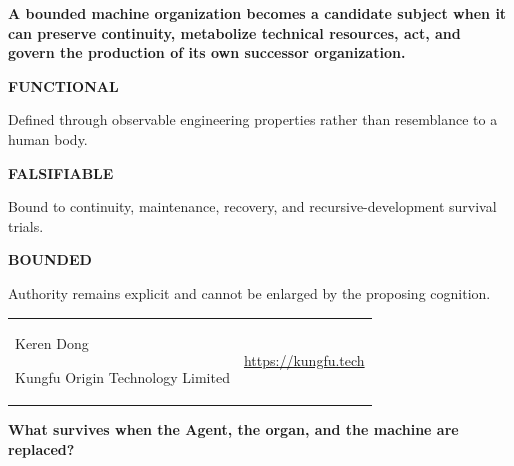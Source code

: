 \documentclass[10pt]{article}
\begin{document}
\begin{titlepage}
\vspace{0.34in}
{\sffamily\bfseries\fontsize{12}{15.5}\selectfont\color{MLWhite}
A bounded machine organization becomes a candidate subject when it can
preserve continuity, metabolize technical resources, act, and govern the
production of its own successor organization.\par}

\vspace{0.23in}
\begin{minipage}[t]{0.315\textwidth}
  \begin{mldarkcard}
    {\sffamily\bfseries\scriptsize\color{MLPeriwinkle}FUNCTIONAL}\par
    {\scriptsize\color{MLWhite}Defined through observable engineering
    properties rather than resemblance to a human body.}
  \end{mldarkcard}
\end{minipage}
\hfill
\begin{minipage}[t]{0.315\textwidth}
  \begin{mldarkcard}
    {\sffamily\bfseries\scriptsize\color{MLPeriwinkle}FALSIFIABLE}\par
    {\scriptsize\color{MLWhite}Bound to continuity, maintenance, recovery,
    and recursive-development survival trials.}
  \end{mldarkcard}
\end{minipage}
\hfill
\begin{minipage}[t]{0.315\textwidth}
  \begin{mldarkcard}
    {\sffamily\bfseries\scriptsize\color{MLPeriwinkle}BOUNDED}\par
    {\scriptsize\color{MLWhite}Authority remains explicit and cannot be
    enlarged by the proposing cognition.}
  \end{mldarkcard}
\end{minipage}

\vfill
\begin{tabularx}{\textwidth}{@{}Xr@{}}
  {\sffamily\color{MLWhite}Keren Dong\par
   \footnotesize Kungfu Origin Technology Limited} &
  {\sffamily\footnotesize\color{MLPeriwinkle}
   \href{https://kungfu.tech}{https://kungfu.tech}}
\end{tabularx}
\end{titlepage}
\pagecolor{MLPaper}

\thispagestyle{fancy}
\par
\vspace{0.1in}
{\rmfamily\bfseries\fontsize{27}{30}\selectfont\color{MLInk}
What survives when the Agent, the organ, and the machine are replaced?\par}
\vspace{0.15in}
\end{document}
